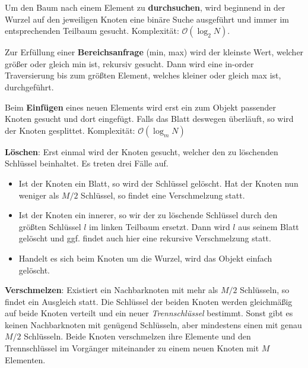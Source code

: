 \documentclass[a4paper,parskip=half*,DIV=15,fontsize=11pt]{scrartcl}
\begin{document}

Um den Baum nach einem Element zu \textbf{durchsuchen}, wird beginnend in der Wurzel auf den jeweiligen Knoten eine binäre Suche ausgeführt und immer im entsprechenden Teilbaum gesucht. Komplexität: $\mathcal{O}(\log_2N)$.

Zur Erfüllung einer \textbf{Bereichsanfrage} (min, max) wird der kleinste Wert, welcher größer oder gleich min ist, rekursiv gesucht. Dann wird eine in-order Traversierung bis zum größten Element, welches kleiner oder gleich max ist, durchgeführt.

Beim \textbf{Einfügen} eines neuen Elements wird erst ein zum Objekt passender Knoten gesucht und dort eingefügt. Falls das Blatt deswegen überläuft, so wird der Knoten gesplittet. Komplexität: $\mathcal{O}(\log_mN)$

\textbf{Löschen}:
Erst einmal wird der Knoten gesucht, welcher den zu löschenden Schlüssel beinhaltet. Es treten drei Fälle auf.
\begin{itemize}
\item Ist der Knoten ein Blatt, so wird der Schlüssel gelöscht. Hat der Knoten nun weniger als $M/2$ Schlüssel, so findet eine Verschmelzung statt.
\item Ist der Knoten ein innerer, so wir der zu löschende Schlüssel durch den größten Schlüssel $l$ im linken Teilbaum ersetzt. Dann wird $l$ aus seinem Blatt gelöscht und ggf. findet auch hier eine rekursive Verschmelzung statt.
\item Handelt es sich beim Knoten um die Wurzel, wird das Objekt einfach gelöscht.
\end{itemize}

\textbf{Verschmelzen}:
Existiert ein Nachbarknoten mit mehr als $M/2$ Schlüsseln, so findet ein Ausgleich statt. Die Schlüssel der beiden Knoten werden gleichmäßig auf beide Knoten verteilt und ein neuer \textit{Trennschlüssel} bestimmt. Sonst gibt es keinen Nachbarknoten mit genügend Schlüsseln, aber mindestens einen mit genau $M/2$ Schlüsseln. Beide Knoten verschmelzen ihre Elemente und den Trennschlüssel im Vorgänger miteinander zu einem neuen Knoten mit $M$ Elementen.
\end{document}
